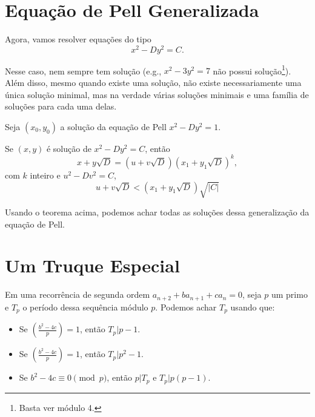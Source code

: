 \documentclass[10pt,a4paper]{article}
\newcommand\sD{\sqrt{D}}
\begin{document}
	\section{Equação de Pell Generalizada}

	Agora, vamos resolver equações do tipo \[x^2 - D y^2 = C.\]

	Nesse caso, nem sempre tem solução (e.g., $x^2 - 3y^2 = 7$ não possui solução\footnote{Basta ver módulo 4.}). Além disso, mesmo quando existe uma solução, não existe necessariamente uma única solução minimal, mas na verdade várias soluções minimais e uma família de soluções para cada uma delas.

	\begin{thm}
		Seja $(x_0, y_0)$ a solução da equação de Pell $x^2 - D y^2 = 1$.

		Se $(x, y)$ é solução de $x^2 - D y^2 = C$, então \[x + y \sD = (u + v \sD) (x_1 + y_1 \sD)^k,\] com $k$ inteiro e $u^2 - D v^2 = C$, \[u + v \sD < (x_1 + y_1 \sD) \sqrt{|C|}\]
	\end{thm}

	Usando o teorema acima, podemos achar todas as soluções dessa generalização da equação de Pell.

	\section{Um Truque Especial}

	\begin{thm}
		Em uma recorrência de segunda ordem $a_{n+2} + ba_{n+1} + ca_n = 0$, seja $p$ um primo e $T_p$ o período dessa sequência módulo $p$. Podemos achar $T_p$ usando que:
		\begin{itemize}
			\item Se $\left(\frac{b^2 - 4c}{p}\right) = 1$, então $T_p | p-1$.
			\item Se $\left(\frac{b^2 - 4c}{p}\right) = 1$, então $T_p | p^2-1$.
			\item Se $b^2 - 4c \equiv 0 \pmod{p}$, então $p | T_p$ e $T_p | p(p-1)$.
		\end{itemize}
	\end{thm}
\end{document}
